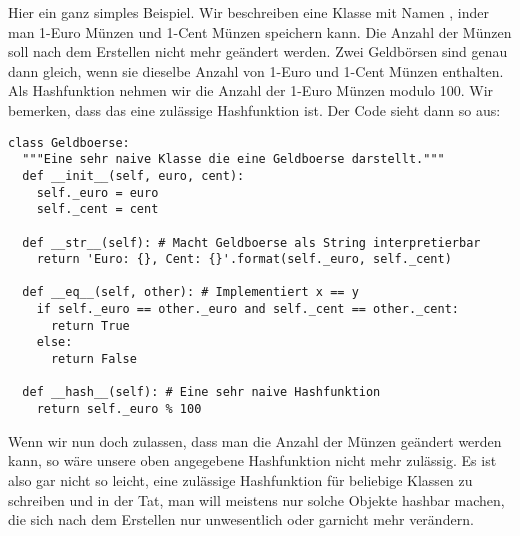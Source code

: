Hier ein ganz simples Beispiel.
Wir beschreiben eine Klasse mit Namen , inder man 1-Euro Münzen und 1-Cent Münzen speichern kann.
Die Anzahl der Münzen soll nach dem Erstellen nicht mehr geändert werden.
Zwei Geldbörsen sind genau dann gleich, wenn sie dieselbe Anzahl von 1-Euro und 1-Cent Münzen enthalten.
Als Hashfunktion nehmen wir die Anzahl der 1-Euro Münzen modulo 100.
Wir bemerken, dass das eine zulässige Hashfunktion ist.
Der Code sieht dann so aus:
\begin{lstlisting}
class Geldboerse:
  """Eine sehr naive Klasse die eine Geldboerse darstellt."""
  def __init__(self, euro, cent):
    self._euro = euro
    self._cent = cent
  
  def __str__(self): # Macht Geldboerse als String interpretierbar
    return 'Euro: {}, Cent: {}'.format(self._euro, self._cent)
  
  def __eq__(self, other): # Implementiert x == y
    if self._euro == other._euro and self._cent == other._cent:
      return True
    else:
      return False
  
  def __hash__(self): # Eine sehr naive Hashfunktion
    return self._euro % 100
\end{lstlisting}

Wenn wir nun doch zulassen, dass man die Anzahl der Münzen geändert werden kann,
so wäre unsere oben angegebene Hashfunktion nicht mehr zulässig.
Es ist also gar nicht so leicht, eine zulässige Hashfunktion für beliebige Klassen zu schreiben und in der Tat,
man will meistens nur solche Objekte hashbar machen, die sich nach dem Erstellen nur unwesentlich oder garnicht mehr verändern.

